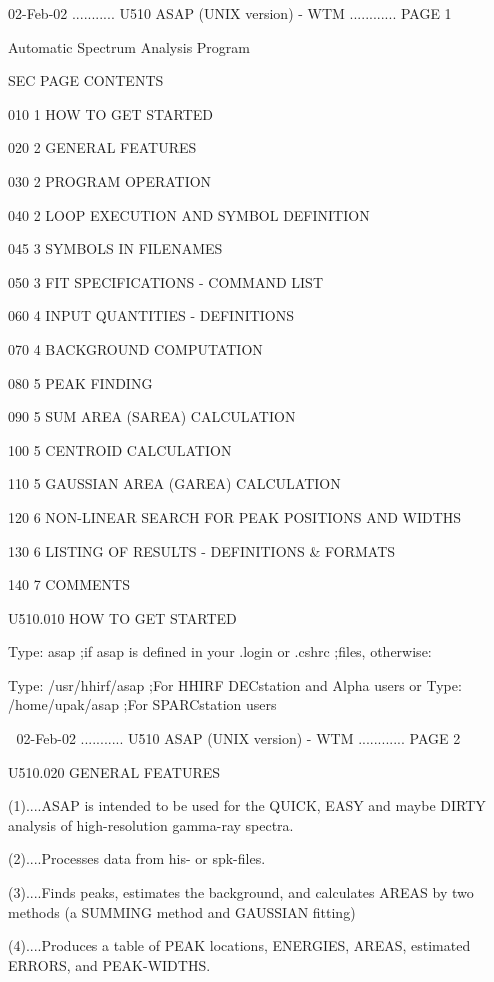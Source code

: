    02-Feb-02 ........... U510  ASAP (UNIX version) - WTM ............ PAGE   1
 
 
 
 
                       Automatic Spectrum Analysis Program
 
 
   SEC PAGE CONTENTS
 
   010   1  HOW TO GET STARTED
 
   020   2  GENERAL FEATURES
 
   030   2  PROGRAM OPERATION
 
   040   2  LOOP EXECUTION AND SYMBOL DEFINITION
 
   045   3  SYMBOLS IN FILENAMES
 
   050   3  FIT SPECIFICATIONS - COMMAND LIST
 
   060   4  INPUT QUANTITIES - DEFINITIONS
 
   070   4  BACKGROUND COMPUTATION
 
   080   5  PEAK FINDING
 
   090   5  SUM AREA (SAREA) CALCULATION
 
   100   5  CENTROID CALCULATION
 
   110   5  GAUSSIAN AREA (GAREA) CALCULATION
 
   120   6  NON-LINEAR SEARCH FOR PEAK POSITIONS AND WIDTHS
 
   130   6  LISTING OF RESULTS - DEFINITIONS & FORMATS
 
   140   7  COMMENTS
 
 
   U510.010  HOW TO GET STARTED
 
 
   Type:  asap               ;if asap is defined in your .login or .cshrc
                             ;files, otherwise:
 
   Type:  /usr/hhirf/asap    ;For HHIRF DECstation and Alpha users
   or
   Type:  /home/upak/asap    ;For SPARCstation users
 
    
   02-Feb-02 ........... U510  ASAP (UNIX version) - WTM ............ PAGE   2
 
 
   U510.020  GENERAL FEATURES
 
   (1)....ASAP  is  intended  to  be  used for the QUICK, EASY and maybe DIRTY
          analysis of high-resolution gamma-ray spectra.
 
   (2)....Processes data from his- or spk-files.
 
   (3)....Finds peaks, estimates the background, and calculates AREAS  by  two
          methods (a SUMMING method and GAUSSIAN fitting)
 
   (4)....Produces  a  table  of  PEAK  locations,  ENERGIES, AREAS, estimated
          ERRORS, and PEAK-WIDTHS.
 
